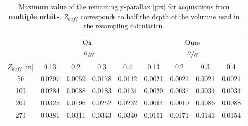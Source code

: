 \documentclass{ipol}
\begin{document}
\begin{table}

\begin{center}
\begin{tabular}{|c|c|c|c|c||c|c|c|c|}

\multicolumn{1}{c}{}  & \multicolumn{4}{c}{Oh~\cite{Oh2011}} & \multicolumn{4}{c}{Ours}   \\
 \cline{2-9} 
 \multicolumn{1}{c}{}  & \multicolumn{4}{|c||}{ $\sfrac{B}{H}$ } & \multicolumn{4}{|c|}{$\sfrac{B}{H}$ }  \\
 \multicolumn{1}{c|}{$Z_{buff}$ [m]}  &  0.13 &  0.2   & 0.3  &  0.4 &  0.13 &  0.2   & 0.3  &  0.4   \\
 \cline{1-9}
  
 50  &  0.0297    &  0.0059   & 0.0178   & 0.0112 & 0.0021   & 0.0021     & 0.0021    &  0.0021   \\
100  &  0.0284    &  0.0088   & 0.0183   & 0.0134 & 0.0029   & 0.0037     & 0.0034    &  0.0034   \\
200  &  0.0325    &  0.0196   & 0.0252   & 0.0232 & 0.0064   & 0.0010     & 0.0086    &  0.0088   \\
270  &  0.0381    &  0.0311   & 0.0343   & 0.0340 & 0.0101   & 0.0171     & 0.0143    &  0.0154   \\
\hline 

\end{tabular}
\end{center}
\caption{Maximum value of the remaining y-parallax [pix] for acquisitions from \textbf{multiple orbits}. $Z_{buff}$ corresponds to half the depth of the volumne used in the resampling calculation.}\label{tab:PHR1multi}
\end{table}
\end{document}
